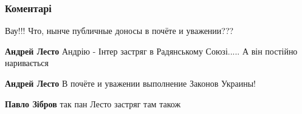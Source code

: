  
 
 
 
 
\subsubsection{Коментарі}
\label{sec:01_08_2021.fb.zibrov_pavel.pevec.ukraina.1.kanal_inter_oleg_vinnik.cmt}

\begin{itemize}


Вау!!! Что, нынче публичные доносы в почёте и уважении???

\begin{itemize}

 
\textbf{Андрей Лесто} Андрію - Інтер застряг в Радянському Союзі.....
А він постійно наривається

 
\textbf{Андрей Лесто} В почёте и уважении выполнение Законов Украины!

 
\textbf{Павло Зібров} так пан Лесто застряг там також

 

\end{itemize}
\end{itemize}
